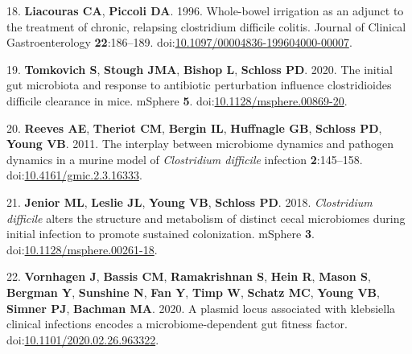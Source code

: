 \documentclass[
  11pt,
]{article}
\begin{document}
\leavevmode\hypertarget{ref-Liacouras1996}{}%
18. \textbf{Liacouras CA}, \textbf{Piccoli DA}. 1996. Whole-bowel
irrigation as an adjunct to the treatment of chronic, relapsing
clostridium difficile colitis. Journal of Clinical Gastroenterology
\textbf{22}:186--189.
doi:\href{https://doi.org/10.1097/00004836-199604000-00007}{10.1097/00004836-199604000-00007}.

\leavevmode\hypertarget{ref-Tomkovich2020}{}%
19. \textbf{Tomkovich S}, \textbf{Stough JMA}, \textbf{Bishop L},
\textbf{Schloss PD}. 2020. The initial gut microbiota and response to
antibiotic perturbation influence clostridioides difficile clearance in
mice. mSphere \textbf{5}.
doi:\href{https://doi.org/10.1128/msphere.00869-20}{10.1128/msphere.00869-20}.

\leavevmode\hypertarget{ref-Reeves2011}{}%
20. \textbf{Reeves AE}, \textbf{Theriot CM}, \textbf{Bergin IL},
\textbf{Huffnagle GB}, \textbf{Schloss PD}, \textbf{Young VB}. 2011. The
interplay between microbiome dynamics and pathogen dynamics in a murine
model of \emph{Clostridium difficile} infection \textbf{2}:145--158.
doi:\href{https://doi.org/10.4161/gmic.2.3.16333}{10.4161/gmic.2.3.16333}.

\leavevmode\hypertarget{ref-Jenior2018}{}%
21. \textbf{Jenior ML}, \textbf{Leslie JL}, \textbf{Young VB},
\textbf{Schloss PD}. 2018. \emph{Clostridium difficile} alters the
structure and metabolism of distinct cecal microbiomes during initial
infection to promote sustained colonization. mSphere \textbf{3}.
doi:\href{https://doi.org/10.1128/msphere.00261-18}{10.1128/msphere.00261-18}.

\leavevmode\hypertarget{ref-Vornhagen2020}{}%
22. \textbf{Vornhagen J}, \textbf{Bassis CM}, \textbf{Ramakrishnan S},
\textbf{Hein R}, \textbf{Mason S}, \textbf{Bergman Y}, \textbf{Sunshine
N}, \textbf{Fan Y}, \textbf{Timp W}, \textbf{Schatz MC}, \textbf{Young
VB}, \textbf{Simner PJ}, \textbf{Bachman MA}. 2020. A plasmid locus
associated with klebsiella clinical infections encodes a
microbiome-dependent gut fitness factor.
doi:\href{https://doi.org/10.1101/2020.02.26.963322}{10.1101/2020.02.26.963322}.
\end{document}
